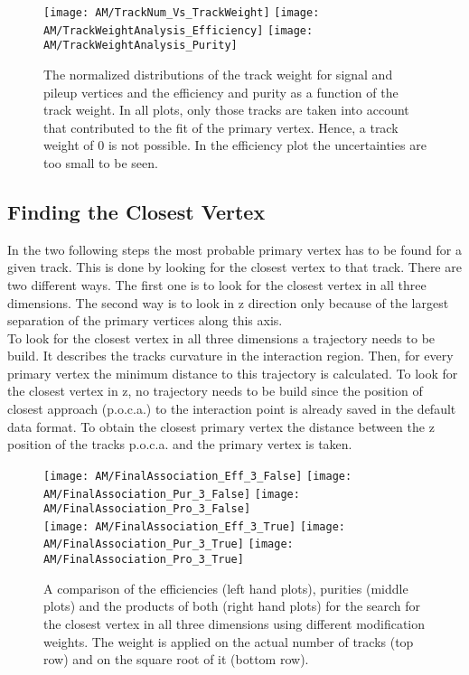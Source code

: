 \begin{figure}[Ht]
    \centering
    \texttt{[image: AM/TrackNum\_Vs\_TrackWeight]}
    \texttt{[image: AM/TrackWeightAnalysis\_Efficiency]}
    \texttt{[image: AM/TrackWeightAnalysis\_Purity]}
    \caption[Distribution of the track weight and efficiency and purity \vs{} track weight]{The normalized distributions of the track weight for signal and pileup vertices and the efficiency and purity as a function of the track weight. In all plots, only those tracks are taken into account that contributed to the fit of the primary vertex. Hence, a track weight of 0 is not possible. In the efficiency plot the uncertainties are too small to be seen.  \label{plot:AMTWdistpureff}}
\end{figure}

\subsection{Finding the Closest Vertex\label{sec:AMWFCV}}

In the two following steps the most probable primary vertex has to be found for a given track. This is done by looking for the closest vertex to that track. There are two different ways. The first one is to look for the closest vertex in all three dimensions. The second way is to look in z direction only because of the largest separation of the primary vertices along this axis. \\
To look for the closest vertex in all three dimensions a trajectory needs to be build. It describes the tracks curvature in the interaction region. Then, for every primary vertex the minimum distance to this trajectory is calculated. To look for the closest vertex in z, no trajectory needs to be build since the position of closest approach (p.o.c.a.) to the interaction point is already saved in the default data format. To obtain the closest primary vertex the distance between the z position of the tracks p.o.c.a. and the primary vertex is taken. \\

\begin{figure}[Ht]
    \centering
    \texttt{[image: AM/FinalAssociation\_Eff\_3\_False]}
    \texttt{[image: AM/FinalAssociation\_Pur\_3\_False]}
    \texttt{[image: AM/FinalAssociation\_Pro\_3\_False]}
    \\
    \texttt{[image: AM/FinalAssociation\_Eff\_3\_True]}
    \texttt{[image: AM/FinalAssociation\_Pur\_3\_True]}
    \texttt{[image: AM/FinalAssociation\_Pro\_3\_True]}
    \caption[Efficiencies, purities and their product using different modification weights for the search in three dimensions.]{A comparison of the efficiencies (left hand plots), purities (middle plots) and the products of both (right hand plots) for the search for the closest vertex in all three dimensions using different modification weights. The weight is applied on the actual number of tracks (top row) and on the square root of it (bottom row).\label{plot:AMWFCV3D}}
\end{figure}

